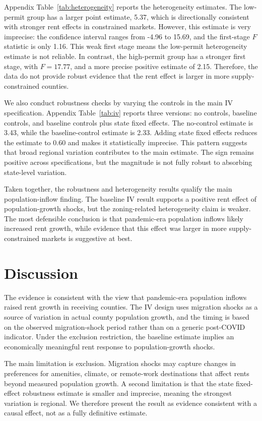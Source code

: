 \documentclass[11pt]{article}
\begin{document}
Appendix Table~\ref{tab:heterogeneity} reports the heterogeneity estimates. The low-permit group has a larger point estimate, 5.37, which is directionally consistent with stronger rent effects in constrained markets. However, this estimate is very imprecise: the confidence interval ranges from -4.96 to 15.69, and the first-stage $F$ statistic is only 1.16. This weak first stage means the low-permit heterogeneity estimate is not reliable. In contrast, the high-permit group has a stronger first stage, with $F=17.77$, and a more precise positive estimate of 2.15. Therefore, the data do not provide robust evidence that the rent effect is larger in more supply-constrained counties.

We also conduct robustness checks by varying the controls in the main IV specification. Appendix Table~\ref{tab:iv} reports three versions: no controls, baseline controls, and baseline controls plus state fixed effects. The no-control estimate is 3.43, while the baseline-control estimate is 2.33. Adding state fixed effects reduces the estimate to 0.60 and makes it statistically imprecise. This pattern suggests that broad regional variation contributes to the main estimate. The sign remains positive across specifications, but the magnitude is not fully robust to absorbing state-level variation.

Taken together, the robustness and heterogeneity results qualify the main population-inflow finding. The baseline IV result supports a positive rent effect of population-growth shocks, but the zoning-related heterogeneity claim is weaker. The most defensible conclusion is that pandemic-era population inflows likely increased rent growth, while evidence that this effect was larger in more supply-constrained markets is suggestive at best.

\section{Discussion}

The evidence is consistent with the view that pandemic-era population inflows raised rent growth in receiving counties. The IV design uses migration shocks as a source of variation in actual county population growth, and the timing is based on the observed migration-shock period rather than on a generic post-COVID indicator. Under the exclusion restriction, the baseline estimate implies an economically meaningful rent response to population-growth shocks.

The main limitation is exclusion. Migration shocks may capture changes in preferences for amenities, climate, or remote-work destinations that affect rents beyond measured population growth. A second limitation is that the state fixed-effect robustness estimate is smaller and imprecise, meaning the strongest variation is regional. We therefore present the result as evidence consistent with a causal effect, not as a fully definitive estimate.
\end{document}
